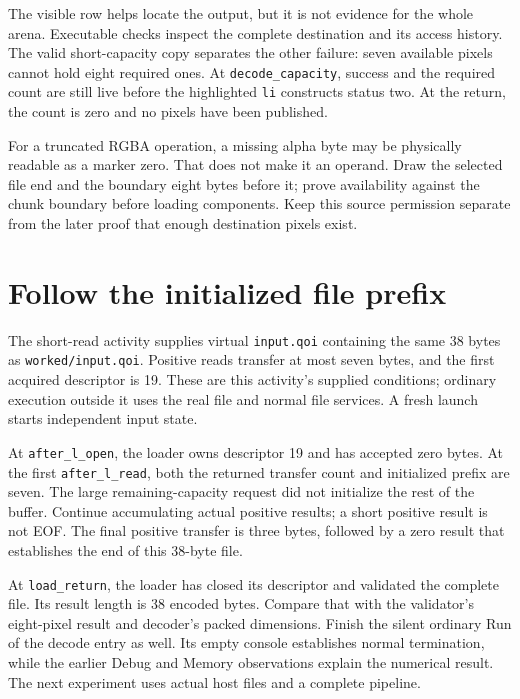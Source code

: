 

The visible row helps locate the output, but it is not evidence for the whole
arena. Executable checks inspect the complete destination and its access history.
The valid short-capacity copy separates the other failure: seven available pixels
cannot hold eight required ones. At \texttt{decode\_capacity}, success and the
required count are still live before the highlighted \texttt{li} constructs
status two. At the return, the count is zero and no pixels have been published.

For a truncated RGBA operation, a missing alpha byte may be physically readable
as a marker zero. That does not make it an operand. Draw the selected file end
and the boundary eight bytes before it; prove availability against the chunk
boundary before loading components. Keep this source permission separate from
the later proof that enough destination pixels exist.

\section{Follow the initialized file prefix}

The short-read activity supplies virtual \texttt{input.qoi} containing the same
38 bytes as \texttt{worked/input.qoi}. Positive reads transfer at most seven
bytes, and the first acquired descriptor is 19. These are this activity's supplied
conditions; ordinary execution outside it uses the real file and normal file
services. A fresh launch starts independent input state.

At \texttt{after\_l\_open}, the loader owns descriptor 19 and has accepted zero
bytes. At the first \texttt{after\_l\_read}, both the returned transfer count
and initialized prefix are seven. The large remaining-capacity request did not
initialize the rest of the buffer. Continue accumulating actual positive results;
a short positive result is not EOF. The final positive transfer is three bytes,
followed by a zero result that establishes the end of this 38-byte file.

At \texttt{load\_return}, the loader has closed its descriptor and validated
the complete file. Its result length is 38 encoded bytes. Compare that with the
validator's eight-pixel result and decoder's packed dimensions. Finish the silent
ordinary Run of the decode entry as well. Its empty console establishes normal
termination, while the earlier Debug and Memory observations explain the numerical
result. The next experiment uses actual host files and a complete pipeline.

